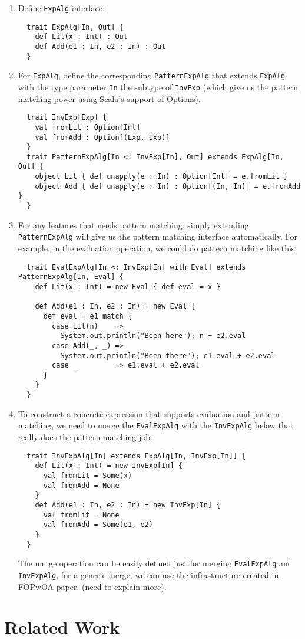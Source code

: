 \documentclass[preprint]{llncs}
\begin{document}
\begin{enumerate}
\item Define \texttt{ExpAlg} interface:
  \begin{lstlisting}
  trait ExpAlg[In, Out] {
    def Lit(x : Int) : Out
    def Add(e1 : In, e2 : In) : Out
  }
  \end{lstlisting}

\item For \texttt{ExpAlg}, define the corresponding
  \texttt{PatternExpAlg} that extends \texttt{ExpAlg} with the type
  parameter \texttt{In} the subtype of \texttt{InvExp} (which give us
  the pattern matching power using Scala's support of Options).
  \begin{lstlisting}
  trait InvExp[Exp] {
    val fromLit : Option[Int]
    val fromAdd : Option[(Exp, Exp)]
  }
  trait PatternExpAlg[In <: InvExp[In], Out] extends ExpAlg[In, Out] {
    object Lit { def unapply(e : In) : Option[Int] = e.fromLit }
    object Add { def unapply(e : In) : Option[(In, In)] = e.fromAdd }
  }
  \end{lstlisting}

\item For any features that needs pattern matching, simply extending
  \texttt{PatternExpAlg} will give us the pattern matching interface
  automatically. For example, in the evaluation operation, we could do
  pattern matching like this:
  \begin{lstlisting}
  trait EvalExpAlg[In <: InvExp[In] with Eval] extends PatternExpAlg[In, Eval] {
    def Lit(x : Int) = new Eval { def eval = x }

    def Add(e1 : In, e2 : In) = new Eval {
      def eval = e1 match {
        case Lit(n)    =>
          System.out.println("Been here"); n + e2.eval
        case Add(_, _) =>
          System.out.println("Been there"); e1.eval + e2.eval
        case _         => e1.eval + e2.eval
      }
    }
  }
  \end{lstlisting}

\item To construct a concrete expression that supports evaluation and
  pattern matching, we need to merge the \texttt{EvalExpAlg} with the
  \texttt{InvExpAlg} below that really does the pattern matching job:
  \begin{lstlisting}
  trait InvExpAlg[In] extends ExpAlg[In, InvExp[In]] {
    def Lit(x : Int) = new InvExp[In] {
      val fromLit = Some(x)
      val fromAdd = None
    }
    def Add(e1 : In, e2 : In) = new InvExp[In] {
      val fromLit = None
      val fromAdd = Some(e1, e2)
    }
  }
  \end{lstlisting}

  The merge operation can be easily defined just for merging
  \texttt{EvalExpAlg} and \texttt{InvExpAlg}, for a generic merge, we
  can use the infrastructure created in FOPwOA
  paper\cite{Oliveira:2013:FPO:2524984.2524987}. (need to explain
  more).


\end{enumerate}

\section{Related Work}\label{sec:related}




\appendix
\end{document}
